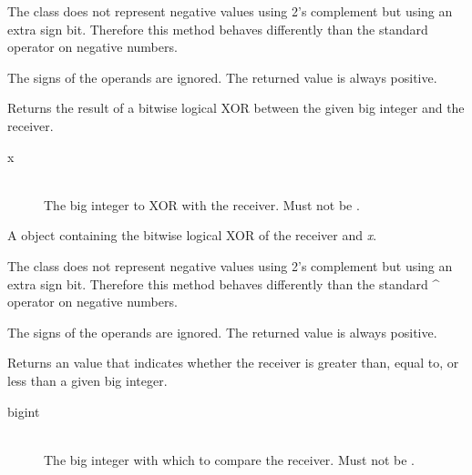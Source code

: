 \docdiscuss

The  class does not represent negative values using 2's complement but using an extra sign bit. Therefore this method behaves differently than the standard \textbar{} operator on negative numbers.

The signs of the operands are ignored. The returned value is always positive.



Returns the result of a bitwise logical XOR between the given big integer and the receiver.


\docparams

\begin{description}
\item[x] \hfill \\ The big integer to XOR with the receiver. Must not be .
\end{description}

\docretval

A  object containing the bitwise logical XOR of the receiver and \emph{x}.

\docdiscuss

The  class does not represent negative values using 2's complement but using an extra sign bit. Therefore this method behaves differently than the standard \textasciicircum{} operator on negative numbers.

The signs of the operands are ignored. The returned value is always positive.



Returns an  value that indicates whether the receiver is greater than, equal to, or less than a given big integer.


\docparams

\begin{description}
\item[bigint] \hfill \\ The big integer with which to compare the receiver. Must not be .
\end{description}

